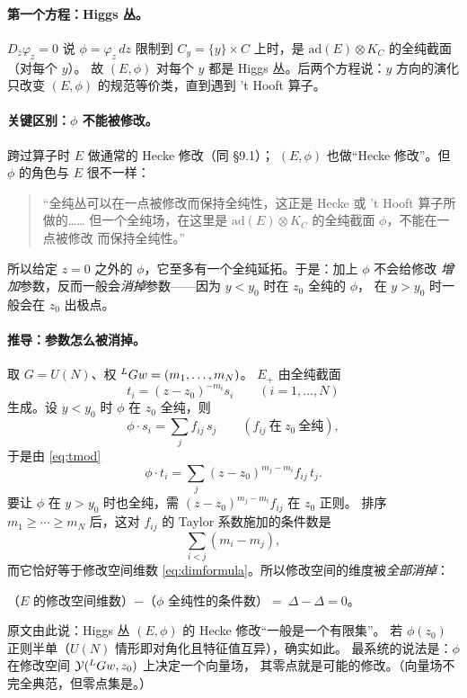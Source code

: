 \paragraph{第一个方程：Higgs 丛。}$D_{\bar z}\varphi_z=0$ 说 $\phi=\varphi_z\,dz$ 限制到
$C_y=\{y\}\times C$ 上时，是 $\mathrm{ad}(E)\otimes K_C$ 的全纯截面（对每个 $y$）。
故 $(E,\phi)$ 对每个 $y$ 都是 Higgs 丛。后两个方程说：$y$ 方向的演化只改变 $(E,\phi)$
的规范等价类，直到遇到 't Hooft{} 算子。\pA{}

\paragraph{关键区别：$\phi$ 不能被修改。}跨过算子时 $E$ 做通常的 Hecke 修改（同 §9.1）；
$(E,\phi)$ 也做“Hecke 修改”。但 $\phi$ 的角色与 $E$ 很不一样：
\begin{quote}
“全纯丛可以在一点被修改而保持全纯性，这正是 Hecke 或 't Hooft 算子所做的……
但一个全纯场，在这里是 $\mathrm{ad}(E)\otimes K_C$ 的全纯截面 $\phi$，不能在一点被修改
而保持全纯性。”
\pA{}
\end{quote}
所以给定 $z=0$ 之外的 $\phi$，它至多有一个全纯延拓。于是：加上 $\phi$ 不会给修改
\emph{增加}参数，反而一般会\emph{消掉}参数——因为 $y<y_0$ 时在 $z_0$ 全纯的 $\phi$，
在 $y>y_0$ 时一般会在 $z_0$ 出极点。

\paragraph{推导：参数怎么被消掉。}取 $G=U(N)$、权 ${}^{L}G w=(m_1,\dots,m_N)$。
$E_+$ 由全纯截面
\begin{equation}
t_i=(z-z_0)^{-m_i}s_i\qquad(i=1,\dots,N)
\label{eq:tmod}
\end{equation}
生成。设 $y<y_0$ 时 $\phi$ 在 $z_0$ 全纯，则
\begin{equation}
\phi\cdot s_i=\sum_jf_{ij}\,s_j\qquad(f_{ij}\ \text{在}\ z_0\ \text{全纯}),
\label{eq:phiS}
\end{equation}
于是由 \eqref{eq:tmod}
\begin{equation}
\phi\cdot t_i=\sum_j(z-z_0)^{m_j-m_i}f_{ij}\,t_j .
\label{eq:phiT}
\end{equation}
要让 $\phi$ 在 $y>y_0$ 时也全纯，需 $(z-z_0)^{m_j-m_i}f_{ij}$ 在 $z_0$ 正则。
排序 $m_1\ge\cdots\ge m_N$ 后，这对 $f_{ij}$ 的 Taylor 系数施加的条件数是
\begin{equation}
\sum_{i<j}(m_i-m_j),
\label{eq:phicount}
\end{equation}
而它恰好等于修改空间维数 \eqref{eq:dimformula}。所以修改空间的维度被\emph{全部消掉}：
\begin{center}
（$E$ 的修改空间维数）$-$（$\phi$ 全纯性的条件数）$=\ \Delta-\Delta=0$。
\end{center}
原文由此说：Higgs 丛 $(E,\phi)$ 的 Hecke 修改“一般是一个有限集”。
若 $\phi(z_0)$ 正则半单（$U(N)$ 情形即对角化且特征值互异），确实如此。
最系统的说法是：$\phi$ 在修改空间 $\mathcal{Y}({}^{L}G w,z_0)$ 上决定一个向量场，
其零点就是可能的修改。（向量场不完全典范，但零点集是。）\pA{}

